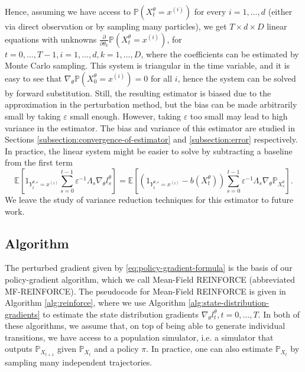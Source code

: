 \documentclass[11pt]{article}
\numberwithin{equation}{section}
\theoremstyle{definition}
\theoremstyle{remark}
\def\eps{\varepsilon}
\begin{document}
Hence, assuming we have access to $\mathbb P(X_t^\theta =x^{(i)})$ for every $i =1,\ldots,d$ (either via direct observation or by sampling many particles), we get $T \times d \times D $ linear equations with unknowns $\frac{\partial }{\partial \theta_k} \mathbb P (X_t^\theta = x^{(i)})$, for $t = 0,\ldots, T- 1,i = 1,\ldots,d, k = 1,\ldots, D$, where the coefficients can be estimated by Monte Carlo sampling.
This system is triangular in the time variable, and it is easy to see that $\nabla_\theta \mathbb P(X_0^\theta = x^{(i)}) = 0$ for all $i$, hence the system can be solved by forward substitution.
Still, the resulting estimator is biased due to the approximation in the perturbation method, but the bias can be made arbitrarily small by taking $\eps$ small enough. 
However, taking $\eps$ too small may lead to high variance in the estimator. 
The bias and variance of this estimator are studied in Sections \ref{subsection:convergence-of-estimator} and \ref{subsection:error} respectively. 
In practice, the linear system might be easier to solve by subtracting a baseline from the first term
\[
\mathbb E \left[ 1_{Y_t^{\theta,\eps} = x^{(i)}} \sum_{s = 0}^{t-1} \eps^{-1}  \Lambda_s \nabla_\theta l_s^\theta \right] = \mathbb E \left[ (1_{Y_t^{\theta,\eps} = x^{(i)}} - b(X^\theta_t) )\sum_{s = 0}^{t-1} \eps^{-1}  \Lambda_s \nabla_\theta \mathbb P_{X_s^\theta} \right].
\]
We leave the study of variance reduction techniques for this estimator to future work.


\subsection{Algorithm}

The perturbed gradient given by \eqref{eq:policy-gradient-formula} is the basis of our policy-gradient algorithm, which we call Mean-Field REINFORCE (abbreviated MF-REINFORCE).
The pseudocode for Mean-Field REINFORCE is given in Algorithm \ref{alg:reinforce}, where we use Algorithm \ref{alg:state-distribution-gradients} to estimate the state distribution gradients $\nabla_\theta l_t^\theta, t = 0, \ldots, T$. In both of these algorithms, we assume that, on top of being able to generate individual transitions, we have access to a population simulator, i.e. a simulator that outputs $\mathbb P_{X_{t+1}}$ given $\mathbb P_{X_t}$ and a policy $\pi$. In practice, one can also estimate $\mathbb P_{X_t}$ by sampling many independent trajectories.
\end{document}
